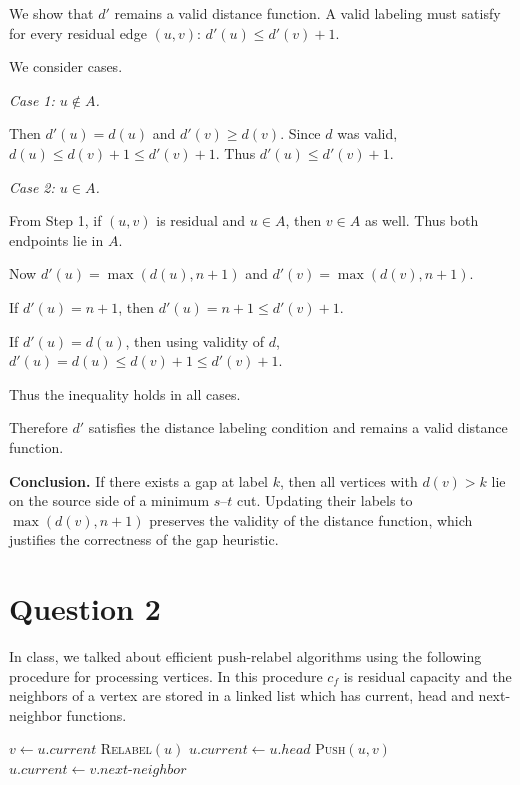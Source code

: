 \documentclass[letterpaper]{article}
\begin{document}
		We show that $d'$ remains a valid distance function. A valid labeling must
		satisfy for every residual edge $(u,v)$:
		$d'(u) \le d'(v) + 1.$
		
		We consider cases.
		
		\medskip
		
		\textit{Case 1: $u \notin A$.}
		
		Then $d'(u) = d(u)$ and $d'(v) \ge d(v)$. Since $d$ was valid,
		$d(u) \le d(v) + 1 \le d'(v) + 1.$
		Thus $d'(u) \le d'(v) + 1$.
		
		\medskip
		
		\textit{Case 2: $u \in A$.}
		
		From Step 1, if $(u,v)$ is residual and $u \in A$, then $v \in A$ as well.
		Thus both endpoints lie in $A$.
		
		Now $d'(u) = \max(d(u), n+1)$ and $d'(v) = \max(d(v), n+1)$.
		
		If $d'(u) = n+1$, then
		$d'(u) = n+1 \le d'(v) + 1.$
		
		If $d'(u) = d(u)$, then using validity of $d$,
		$d'(u) = d(u) \le d(v) + 1 \le d'(v) + 1.$
		
		Thus the inequality holds in all cases.
		
		\medskip
		
		Therefore $d'$ satisfies the distance labeling condition and remains a
		valid distance function.
		
		\medskip
		
		\textbf{Conclusion.}  
		If there exists a gap at label $k$, then all vertices with $d(v) > k$ lie
		on the source side of a minimum $s$--$t$ cut. Updating their labels to
		$\max(d(v), n+1)$ preserves the validity of the distance function, which
		justifies the correctness of the gap heuristic.
		
		\clearpage
	
	\section{Question 2}
	
	In class, we talked about efficient push-relabel algorithms using the following
	procedure for processing vertices. In this procedure $c_f$ is residual capacity
	and the neighbors of a vertex are stored in a linked list which has
	{current}, {head} and {next-neighbor} functions.
	
	\medskip

	
	\begin{algorithm}[h]
		\caption{\textsc{Discharge}$(u)$}
		\begin{algorithmic}[1]
			\State $v \gets u.\mathit{current}$
			\State \textsc{Relabel}$(u)$
			\State $u.\mathit{current} \gets u.\mathit{head}$
			\State \textsc{Push}$(u,v)$
			\Else
			\State $u.\mathit{current} \gets v.\mathit{next\mbox{-}neighbor}$
			\EndIf
			\EndWhile
		\end{algorithmic}
	\end{algorithm}
	
\end{document}
